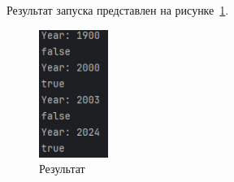 \documentclass[a4paper, 14pt]{extarticle}
\begin{document}
Результат запуска представлен на рисунке~\ref{fig:img1}.

\begin{figure}[!htb]
	\centering
	\includegraphics[width=0.2\textwidth]{img1}
\caption{Результат}
\label{fig:img1}
\end{figure}
\end{document}

